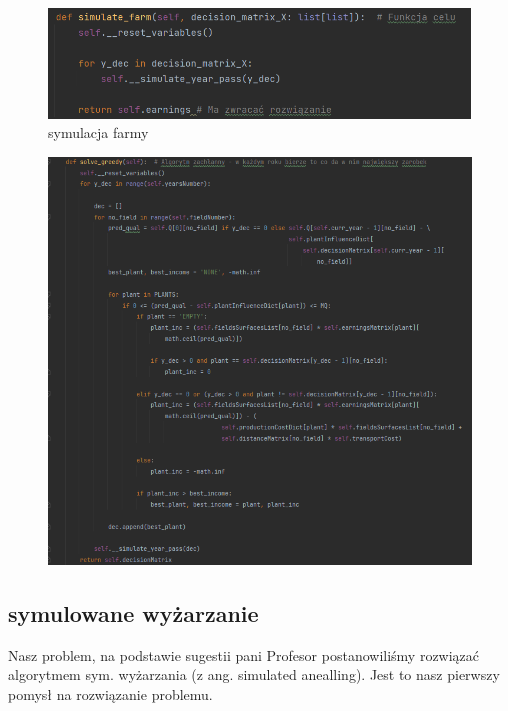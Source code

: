 \documentclass[12pt,a4paper]{article}
\begin{document}
\begin{figure}[H]
	\centering
	\includegraphics[width=1\linewidth]{screens/stm_farmy}
	\caption{symulacja farmy}
	\label{fig:stmfarmy}
\end{figure}

\begin{figure}[H]
	\centering
	\includegraphics[width=1\linewidth]{screens/greedy}
	\caption{}
	\label{fig:greedy}
\end{figure}


\subsection{symulowane wyżarzanie}
 Nasz problem, na podstawie sugestii pani Profesor postanowiliśmy rozwiązać algorytmem sym. wyżarzania (z ang. simulated anealling). Jest to nasz pierwszy pomysł na rozwiązanie problemu.
\end{document}
